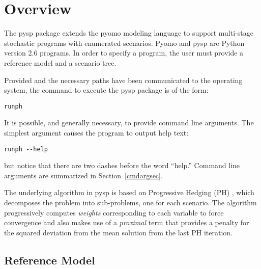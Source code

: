 \def\Argmax{\mathop{\rm argmax}}
\newcommand{\xBar}{\Vector{\overline{x}}}
\newcommand{\Bar}[1]{\overline{#1}}
\newcommand{\Prl}{\mbox{Pr}(\ell)}

\newcommand{\Vector}[1]{\mbox{{\boldmath $#1$}}}
\newcommand{\Matrix}[1]{\mbox{{\boldmath $#1$}}}
\newcommand{\VectLen}[1]{\mid\Vector{#1}\mid}
\newcommand{\Rint}[1]{\int_{#1}^{\infty}}
\newcommand{\Size}[1]{\mid #1 \mid}
\newcommand{\Floor}[1]{\lfloor #1 \rfloor}
\newcommand{\Ceil}[1]{\left\lceil #1 \right\rceil}

\section{Overview}

The pysp package extends the pyomo modeling language to support multi-stage
stochastic programs with enumerated scenarios. Pyomo and pysp are Python version
2.6 programs. In order to specify a program, the user must provide a reference
model and a scenario tree.

Provided and the necessary paths have been communicated to the operating system,
the command to execute the pysp package is of the form:

\begin{verbatim}
runph
\end{verbatim}

It is possible, and generally necessary, to provide command line arguments. The
simplest argument causes the program to output help text:

\begin{verbatim}
runph --help
\end{verbatim}

but notice that there are two dashes before the word ``help.'' Command line
arguments are summarized in Section~\ref{cmdargsec}.

The underlying algorithm in pysp is based on Progressive Hedging (PH)
\cite{RockafellarWets}, which decomposes the problem into sub-problems, one for
each scenario. The algorithm progressively computes {\em weights} corresponding
to each variable to force convergence and also makes use of a {\em proximal}
term that provides a penalty for the squared deviation from the mean solution
from the last PH iteration.

\subsection{Reference Model}

